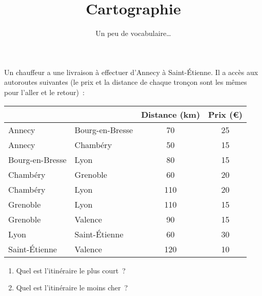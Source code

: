 \documentclass[12pt, aspectratio=43, xcolor=table]{beamer}
\title{Cartographie}
\subtitle{Un peu de vocabulaire…}
\begin{document}
\begin{frame}
  Un chauffeur a une livraison à effectuer d'Annecy à Saint-Étienne. Il a accès aux autoroutes suivantes (le prix et la distance de chaque tronçon sont les mêmes pour l'aller et le retour) :
  \begin{center}
    \begin{tabular}{llcc}
      \toprule
      && Distance (km) & Prix (€) \\
      \midrule
      Annecy & Bourg-en-Bresse & 70 & 25 \\
      Annecy & Chambéry & 50 & 15 \\
      Bourg-en-Bresse & Lyon & 80 & 15 \\
      Chambéry & Grenoble & 60 & 20 \\
      Chambéry & Lyon & 110 & 20 \\
      Grenoble & Lyon & 110 & 15 \\
      Grenoble & Valence & 90 & 15 \\
      Lyon & Saint-Étienne & 60 & 30 \\
      Saint-Étienne & Valence & 120 & 10 \\
      \bottomrule
    \end{tabular}
  \end{center}

  \begin{enumerate}
    \item Quel est l'itinéraire le plus court ?
    \item Quel est l'itinéraire le moins cher ?
  \end{enumerate}

\end{frame}
\end{document}
